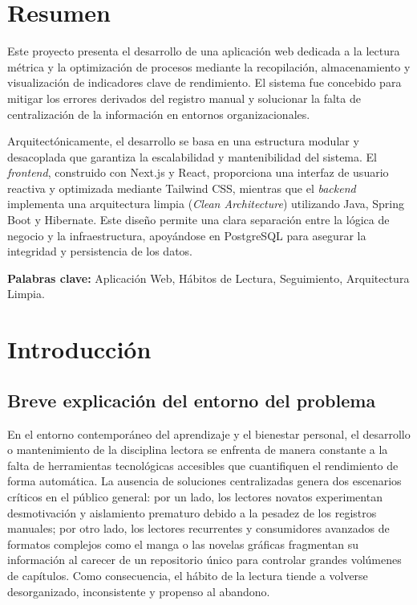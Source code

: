 \documentclass[12pt, atypical, journal]{article}
\begin{document}
\listoffigures
\newpage

\listoftables
\newpage

\section{Resumen}

Este proyecto presenta el desarrollo de una aplicación web dedicada a la lectura métrica y la optimización de procesos mediante la recopilación, almacenamiento y visualización de indicadores clave de rendimiento. El sistema fue concebido para mitigar los errores derivados del registro manual y solucionar la falta de centralización de la información en entornos organizacionales.

Arquitectónicamente, el desarrollo se basa en una estructura modular y desacoplada que garantiza la escalabilidad y mantenibilidad del sistema. El \textit{frontend}, construido con Next.js y React, proporciona una interfaz de usuario reactiva y optimizada mediante Tailwind CSS, mientras que el \textit{backend} implementa una arquitectura limpia (\textit{Clean Architecture}) utilizando Java, Spring Boot y Hibernate. Este diseño permite una clara separación entre la lógica de negocio y la infraestructura, apoyándose en PostgreSQL para asegurar la integridad y persistencia de los datos.

\vspace{0.5cm}
\noindent \textbf{Palabras clave:} Aplicación Web, Hábitos de Lectura, Seguimiento, Arquitectura Limpia.

\section{Introducción}

\subsection{Breve explicación del entorno del problema}
En el entorno contemporáneo del aprendizaje y el bienestar personal, el desarrollo o mantenimiento de la disciplina lectora se enfrenta de manera constante a la falta de herramientas tecnológicas accesibles que cuantifiquen el rendimiento de forma automática. La ausencia de soluciones centralizadas genera dos escenarios críticos en el público general: por un lado, los lectores novatos experimentan desmotivación y aislamiento prematuro debido a la pesadez de los registros manuales; por otro lado, los lectores recurrentes y consumidores avanzados de formatos complejos como el manga o las novelas gráficas fragmentan su información al carecer de un repositorio único para controlar grandes volúmenes de capítulos. Como consecuencia, el hábito de la lectura tiende a volverse desorganizado, inconsistente y propenso al abandono.
\end{document}
